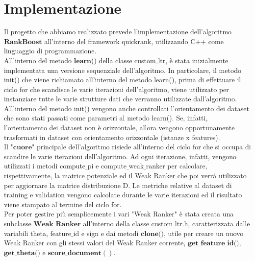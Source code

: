 \chapter*{Implementazione}

Il progetto che abbiamo realizzato prevede l'implementazione dell'algoritmo $\textbf{RankBoost}$ all'interno del framework quickrank, utilizzando C++ come linguaggio di programmazione.\\
All'interno del metodo $\textbf{learn}$() della classe custom$\_$ltr, è stata inizialmente implementata una versione sequenziale dell'algoritmo. In particolare, il metodo init() che viene richiamato all'interno del metodo learn(), prima di effettuare il ciclo for che scandisce le varie iterazioni dell'algoritmo, viene utilizzato per instanziare tutte le varie strutture dati che verranno utilizzate dall'algoritmo. All'interno del metodo init() vengono anche controllati l'orientamento dei dataset che sono stati passati come parametri al metodo learn(). Se, infatti, l'orientamento dei dataset non è orizzontale, allora vengono opportunamente trasformati in dataset con orientamento orizzontale (istanze x features).\\
Il "$\textbf{cuore}$" principale dell'algoritmo risiede all'interno del ciclo for che si occupa di scandire le varie iterazioni dell'algoritmo. Ad ogni iterazione, infatti, vengono utilizzati i metodi compute$\_$pi e compute$\_$weak$\_$ranker per calcolare, rispettivamente, la matrice potenziale ed il Weak Ranker che poi verrà utilizzato per aggiornare la matrice distribuzione D. Le metriche relative al dataset di training e validation vengono calcolate durante le varie iterazioni ed il risultato viene stampato al termine del ciclo for.\\
Per poter gestire più semplicemente i vari "Weak Ranker" è stata creata una subclasse $\textbf{Weak Ranker}$ all'interno della classe custom$\_$ltr.h, caratterizzata dalle variabili theta, feature$\_$id e sign e dai metodi $\textbf{clone()}$, utile per creare un nuovo Weak Ranker con gli stessi valori del Weak Ranker corrente, $\textbf{get}\_\textbf{feature}\_\textbf{id()}$, $\textbf{get}\_\textbf{theta()}$ e $\textbf{score}\_\textbf{document}()$.\\

